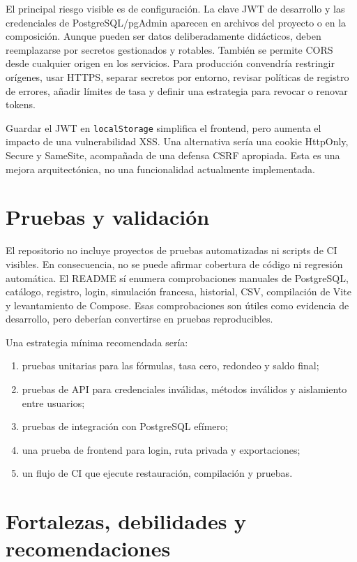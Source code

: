 \documentclass[12pt,a4paper]{article}
\begin{document}
El principal riesgo visible es de configuración. La clave JWT de desarrollo y
las credenciales de PostgreSQL/pgAdmin aparecen en archivos del proyecto o en
la composición. Aunque pueden ser datos deliberadamente didácticos, deben
reemplazarse por secretos gestionados y rotables. También se permite CORS
desde cualquier origen en los servicios. Para producción convendría restringir
orígenes, usar HTTPS, separar secretos por entorno, revisar políticas de
registro de errores, añadir límites de tasa y definir una estrategia para
revocar o renovar tokens.

Guardar el JWT en \texttt{localStorage} simplifica el frontend, pero aumenta
el impacto de una vulnerabilidad XSS. Una alternativa sería una cookie
HttpOnly, Secure y SameSite, acompañada de una defensa CSRF apropiada. Esta es
una mejora arquitectónica, no una funcionalidad actualmente implementada.

\section{Pruebas y validación}

El repositorio no incluye proyectos de pruebas automatizadas ni scripts de
CI visibles. En consecuencia, no se puede afirmar cobertura de código ni
regresión automática. El README sí enumera comprobaciones manuales de
PostgreSQL, catálogo, registro, login, simulación francesa, historial, CSV,
compilación de Vite y levantamiento de Compose. Esas comprobaciones son útiles
como evidencia de desarrollo, pero deberían convertirse en pruebas
reproducibles.

Una estrategia mínima recomendada sería:
\begin{enumerate}[label=\arabic*.]
  \item pruebas unitarias para las fórmulas, tasa cero, redondeo y saldo final;
  \item pruebas de API para credenciales inválidas, métodos inválidos y
  aislamiento entre usuarios;
  \item pruebas de integración con PostgreSQL efímero;
  \item una prueba de frontend para login, ruta privada y exportaciones;
  \item un flujo de CI que ejecute restauración, compilación y pruebas.
\end{enumerate}

\section{Fortalezas, debilidades y recomendaciones}
\end{document}
